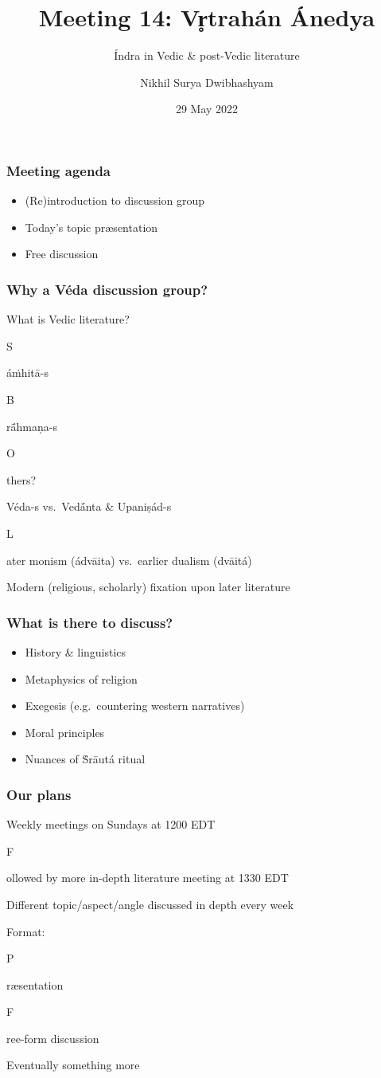 \documentclass[pdf]{beamer}
\title{Meeting 14: Vr̥trahán Ánedya}
\subtitle{Índra in Vedic \& post-Vedic literature}
\author{Nikhil Surya Dwibhashyam}
\date{29 May 2022}
\newcommand{\Subitem}[1]{{\setlength\itemindent{12pt} \item[-] #1}}
\begin{document}
\frame{\titlepage}

\begin{frame} \frametitle{Meeting agenda}
\begin{itemize}
	\item (Re)introduction to discussion group
	\item Today's topic præsentation
	\item Free discussion
\end{itemize}
\end{frame}

\begin{frame} \frametitle{Why a Véda discussion group?}
\begin{itemize}
	\item What is Vedic literature?
	\Subitem Sáṁhitā-s
	\Subitem Brā́hmaṇa-s
	\Subitem Others?
	\item Véda-s vs.~Vedā́nta \& Upaniṣád-s
	\Subitem Later monism (ádvāita) vs.~earlier dualism (dvāitá)
	\item Modern (religious, scholarly) fixation upon later literature
\end{itemize}
\end{frame}

\begin{frame} \frametitle{What is there to discuss?}
\begin{itemize}
	\item History \& linguistics
	\item Metaphysics of religion
	\item Exegesis (e.g.~countering western narratives)
	\item Moral principles
	\item Nuances of Ṡrāutá ritual
\end{itemize}
\end{frame}

\begin{frame} \frametitle{Our plans}
\begin{itemize}
	\item Weekly meetings on Sundays at 1200 EDT
	\Subitem Followed by more in-depth literature meeting at 1330 EDT
	\item Different topic/aspect/angle discussed in depth every week
	\item Format:
	\Subitem Præsentation
	\Subitem Free-form discussion
	\item Eventually something more
\end{itemize}
\end{frame}
\end{document}
